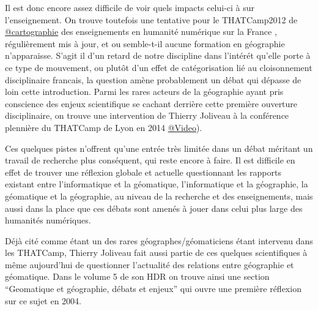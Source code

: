 Il est donc encore assez difficile de voir quels impacts celui-ci à sur l'enseignement. On trouve toutefois une tentative pour le THATCamp2012 de \href{http://pireh.univ-paris1.fr/DHfrancophone/index.php?rem&val=g%C3%A9ographie}{@cartographie} des enseignements en humanité numérique sur la France \autocites{Berra2012b,Clavaud2012}, régulièrement mis à jour, et ou semble-t-il aucune formation en géographie n'apparaisse. S'agit il d'un retard de notre discipline dans l'intérét qu'elle porte à ce type de mouvement, ou plutôt d'un effet de catégorisation lié au cloisonnement disciplinaire francais, la question amène probablement un débat qui dépasse de loin cette introduction. Parmi les rares acteurs de la géographie ayant pris conscience des enjeux scientifique se cachant derrière cette première ouverture disciplinaire, on trouve une intervention de Thierry Joliveau à la conférence plennière du THATCamp de Lyon en 2014 \href{http://dhlyon.hypotheses.org/587}{@Video}).

Ces quelques pistes n'offrent qu'une entrée très limitée dans un débat méritant un travail de recherche plus conséquent, qui reste encore à faire. Il est difficile en effet de trouver une réflexion globale et actuelle questionnant les rapports existant entre l'informatique et la géomatique, l'informatique et la géographie, la géomatique et la géographie, au niveau de la recherche et des enseignements, mais aussi dans la place que ces débats sont amenés à jouer dans celui plus large des humanités numériques.


Déjà cité comme étant un des rares géographes/géomaticiens étant intervenu dans les THATCamp, Thierry Joliveau fait aussi partie de ces quelques scientifiques à même aujourd'hui de questionner l'actualité des relations entre géographie et géomatique. Dans le volume 5 de son HDR on trouve ainsi une section \enquote{Geomatique et géographie, débats et enjeux} qui ouvre une première réflexion sur ce sujet en 2004.


